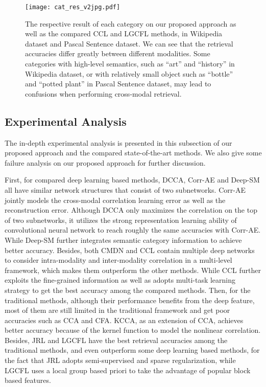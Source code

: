 \documentclass[journal]{IEEEtran}
\begin{document}
 \begin{figure*}[!t]
	\centering
	\texttt{[image: cat\_res\_v2jpg.pdf]}
	\caption{The respective result of each category on our proposed approach as well as the compared CCL \cite{peng2017ccl} and LGCFL \cite{DBLP:journals/tmm/KangXLXP15} methods, in Wikipedia dataset and Pascal Sentence dataset. We can see that the retrieval accuracies differ greatly between different modalities. Some categories with high-level semantics, such as ``art'' and ``history'' in Wikipedia dataset, or with relatively small object such as ``bottle'' and ``potted plant'' in Pascal Sentence dataset, may lead to confusions when performing cross-modal retrieval.
	}
	\setlength{\abovecaptionskip}{-1.5cm}
	\label{fig_cat}
\end{figure*}

\subsection{Experimental Analysis}

The in-depth experimental analysis is presented in this subsection of our proposed approach and the compared state-of-the-art methods. We also give some failure analysis on our proposed approach for further discussion.

First, for compared deep learning based methods, DCCA, Corr-AE and Deep-SM all have similar network structures that consist of two subnetworks. Corr-AE jointly models the cross-modal correlation learning error as well as the reconstruction error. Although DCCA only maximizes the correlation on the top of two subnetworks, it utilizes the strong representation learning ability of convolutional neural network to reach roughly the same accuracies with Corr-AE. While Deep-SM further integrates semantic category information to achieve better accuracy. Besides, both CMDN and CCL contain multiple deep networks to consider intra-modality and inter-modality correlation in a multi-level framework, which makes them outperform the other methods. While CCL further exploits the fine-grained information as well as adopts multi-task learning strategy to get the best accuracy among the compared methods. Then, for the traditional methods, although their performance benefits from the deep feature, most of them are still limited in the traditional framework and get poor accuracies such as CCA and CFA. KCCA, as an extension of CCA, achieves better accuracy because of the kernel function to model the nonlinear correlation. Besides, JRL and LGCFL have the best retrieval accuracies among the traditional methods, and even outperform some deep learning based methods, for the fact that JRL adopts semi-supervised and sparse regularization, while LGCFL uses a local group based priori to take the advantage of popular block based features.
\end{document}
